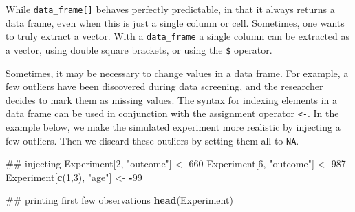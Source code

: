 \documentclass[]{svmono}
\newenvironment{Shaded}{\begin{snugshade}}{\end{snugshade}}
\newcommand{\KeywordTok}[1]{\textcolor[rgb]{0.13,0.29,0.53}{\textbf{#1}}}
\newcommand{\DecValTok}[1]{\textcolor[rgb]{0.00,0.00,0.81}{#1}}
\newcommand{\StringTok}[1]{\textcolor[rgb]{0.31,0.60,0.02}{#1}}
\newcommand{\OperatorTok}[1]{\textcolor[rgb]{0.81,0.36,0.00}{\textbf{#1}}}
\newcommand{\NormalTok}[1]{#1}
\begin{document}
\begin{Shaded}
\end{Shaded}

While \texttt{data\_frame{[}{]}} behaves perfectly predictable, in that
it always returns a data frame, even when this is just a single column
or cell. Sometimes, one wants to truly extract a vector. With a
\texttt{data\_frame} a single column can be extracted as a vector, using
double square brackets, or using the \texttt{\$} operator.

\begin{Shaded}
\end{Shaded}

Sometimes, it may be necessary to change values in a data frame. For
example, a few outliers have been discovered during data screening, and
the researcher decides to mark them as missing values. The syntax for
indexing elements in a data frame can be used in conjunction with the
assignment operator \texttt{\textless{}-}. In the example below, we make
the simulated experiment more realistic by injecting a few outliers.
Then we discard these outliers by setting them all to \texttt{NA}.

\begin{Shaded}
\begin{Highlighting}[]
\NormalTok{## injecting}
\NormalTok{Experiment[}\DecValTok{2}\NormalTok{,      }\StringTok{"outcome"}\NormalTok{] <-}\StringTok{ }\DecValTok{660}
\NormalTok{Experiment[}\DecValTok{6}\NormalTok{,      }\StringTok{"outcome"}\NormalTok{] <-}\StringTok{ }\DecValTok{987}
\NormalTok{Experiment[}\KeywordTok{c}\NormalTok{(}\DecValTok{1}\NormalTok{,}\DecValTok{3}\NormalTok{), }\StringTok{"age"}\NormalTok{]     <-}\StringTok{ }\OperatorTok{-}\DecValTok{99}

\NormalTok{## printing first few observations}
\KeywordTok{head}\NormalTok{(Experiment)}
\end{Highlighting}
\end{Shaded}
\end{document}
